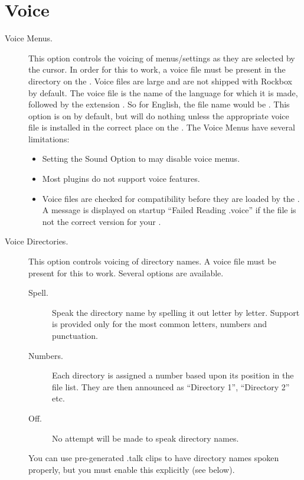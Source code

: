 \section{\label{ref:Voiceconfiguration}Voice}

  \begin{description}
  \item[Voice Menus.]
    This option controls the voicing of menus/settings as they are selected
    by the cursor. In order for this to work, a voice file must be present 
    in the  directory on the \dap.  Voice files are large
    and are not shipped with Rockbox by default.
    The voice file is the name of the language for which it is made, followed
    by the extension .  So for English, the file name would be 
    .
    This option is on by default, but will do nothing unless the 
    appropriate voice file is installed in the correct place on the \dap.
    The Voice Menus have several limitations:
    \begin{itemize}
    \item Setting the Sound Option  to  may 
      disable voice menus.
    \item Most plugins  do not support
      voice features.
    \item Voice files are checked for compatibility before they are loaded
      by the \dap. A message is displayed on startup ``Failed Reading .voice''
      if the  file is not the correct version for your \dap.
    \end{itemize}

  \item[Voice Directories.]
    This option controls voicing of directory names. A voice file must be present 
    for this to work. Several options are available.
    \begin{description}
    \item[Spell.]
      Speak the directory name by spelling it out letter by letter.  Support
      is provided only for the most common letters, numbers and punctuation.
    \item[Numbers.]
      Each directory is assigned a number based upon its position in the
      file list.  They are then announced as ``Directory 1'', ``Directory 2''
      etc.
    \item[Off.]
      No attempt will be made to speak directory names.
    \end{description}
    You can use pre-generated .talk clips to have  directory names spoken 
    properly, but you must enable this explicitly (see below).


\end{description}
